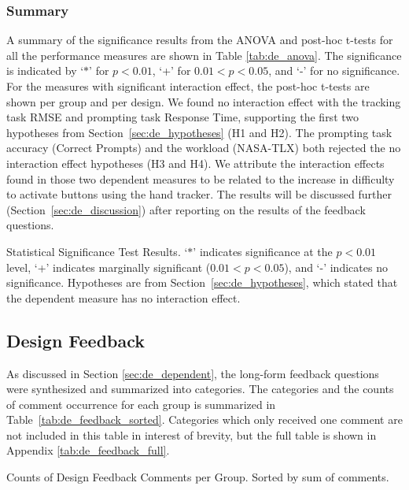 \subsubsection{Summary}

A summary of the significance results from the ANOVA and post-hoc t-tests for all the performance measures are shown in Table \ref{tab:de_anova}.
The significance is indicated by `$*$' for $p<0.01$, `+' for $0.01<p<0.05$, and `-' for no significance.
For the measures with significant interaction effect, the post-hoc t-tests are shown per group and per design.
We found no interaction effect with the tracking task RMSE and prompting task Response Time, supporting the first two hypotheses from Section~\ref{sec:de_hypotheses} (H1 and H2).
The prompting task accuracy (Correct Prompts) and the workload (NASA-TLX) both rejected the no interaction effect hypotheses (H3 and H4).
We attribute the interaction effects found in those two dependent measures to be related to the increase in difficulty to activate buttons using the hand tracker.
The results will be discussed further (Section~\ref{sec:de_discussion}) after reporting on the results of the feedback questions.

\begin{table}
    \centering
    \caption{Statistical Significance Test Results. `$*$' indicates significance at the $p<0.01$ level, `+' indicates marginally significant ($0.01<p<0.05$), and `-' indicates no significance. Hypotheses are from Section~\ref{sec:de_hypotheses}, which stated that the dependent measure has no interaction effect.}
    \label{tab:de_anova}
\end{table}

\subsection{Design Feedback}

As discussed in Section \autoref{sec:de_dependent}, the long-form feedback questions were synthesized and summarized into categories.
The categories and the counts of comment occurrence for each group is summarized in Table~\ref{tab:de_feedback_sorted}.
Categories which only received one comment are not included in this table in interest of brevity, but the full table is shown in Appendix \ref{tab:de_feedback_full}.

\begin{table}
    \centering
    \caption{Counts of Design Feedback Comments per Group. Sorted by sum of comments.}
    \label{tab:de_feedback_sorted}
\end{table}

